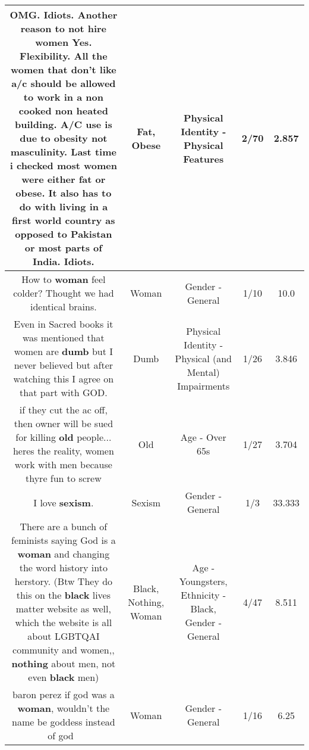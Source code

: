 \documentclass[11pt]{article}
\newlength\mylength
\begin{document}
\begin{center}
\begin{longtable}{|C{.65\mylength}|C{.30\mylength}|C{.12\mylength}|C{.12\mylength}|C{.12\mylength}|}
  \small OMG. Idiots.  Another reason to not hire women Yes. Flexibility.  All the women that don't like a/c should be allowed to work in a non cooked non heated building.  A/C use is due to obesity not masculinity.  Last time i checked most women were either \textbf{fat} or \textbf{obese}.  It also has to do with living in a first world country as opposed to Pakistan or most parts of India.  Idiots.\normalsize   & Fat, Obese & Physical Identity - Physical Features & 2/70 & 2.857 \\  \hline
  \small How to \textbf{woman} feel colder?  Thought we had identical brains.\normalsize   & Woman & Gender - General & 1/10 & 10.0 \\  \hline
  \small Even in Sacred books it was mentioned that women are \textbf{dumb} but I never believed but after watching this I agree on that part with GOD.\normalsize   & Dumb & Physical Identity - Physical (and Mental) Impairments & 1/26 & 3.846 \\  \hline
  \small if they cut the ac off, then owner will be sued for killing \textbf{old} people... heres the reality, women work with men because thyre fun to screw\normalsize   & Old & Age - Over 65s & 1/27 & 3.704 \\  \hline
  \small I love \textbf{sexism}.\normalsize   & Sexism & Gender - General & 1/3 & 33.333 \\  \hline
  \small There are a bunch of feminists saying God is a \textbf{woman} and changing the word history into herstory. (Btw They do this on the \textbf{black} lives matter website as well, which the website is all about LGBTQAI community and women,, \textbf{nothing} about men, not even \textbf{black} men)\normalsize   & Black, Nothing, Woman & Age - Youngsters, Ethnicity - Black, Gender - General & 4/47 & 8.511 \\  \hline
  \small baron perez if god was a \textbf{woman}, wouldn't the name be goddess instead of god 🤔\normalsize   & Woman & Gender - General & 1/16 & 6.25 \\  \hline

\end{longtable}
\end{center}
\end{document}
